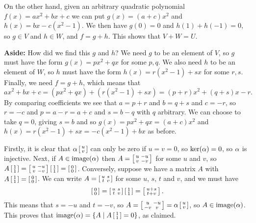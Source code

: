  On the other hand, given an arbitrary quadratic polynomial
 $f(x)=ax^2+bx+c$ we can put $g(x)=(a+c)x^2$ and
 $h(x)=bx-c(x^2-1)$.  We then have $g(0)=0$ and
 $h(1)+h(-1)=0$, so $g\in V$ and $h\in W$, and $f=g+h$.
 This shows that $V+W=U$.

 \textbf{Aside:}
 How did we find this $g$ and $h$?  We need $g$ to be an element of
 $V$, so $g$ must have the form $g(x)=px^2+qx$ for some $p,q$.  We
 also need $h$ to be an element of $W$, so $h$ must have the form
 $h(x)=r(x^2-1)+sx$ for some $r,s$.  Finally, we need $f=g+h$, which
 means that
 \[ ax^2+bx+c = (px^2+qx)+(r(x^2-1)+sx)
     = (p+r)x^2 + (q+s)x - r.
 \]
 By comparing coefficients we see that $a=p+r$ and $b=q+s$ and $c=-r$,
 so $r=-c$ and $p=a-r=a+c$ and $s=b-q$ with $q$ arbitrary.  We can
 choose to take $q=0$, giving $s=b$ and so $g(x)=px^2+qx=(a+c)x^2$ and
 $h(x)=r(x^2-1)+sx=-c(x^2-1)+bx$ as before.
\EndDeferredSolution

 Firstly, it is clear that $\alpha\left[\begin{smallmatrix} u\\ v\end{smallmatrix}\right]$ can only be
 zero if $u=v=0$, so $\ker(\alpha)=0$, so $\alpha$ is injective.
 Next, if $A\in\operatorname{image}(\alpha)$ then $A=\left[\begin{smallmatrix} u& -u\\ v&-v\end{smallmatrix}\right]$ for
 some $u$ and $v$, so
 $A\left[\begin{smallmatrix} 1\\1\end{smallmatrix}\right]=\left[\begin{smallmatrix} u&-u\\ v&-v\end{smallmatrix}\right]\left[\begin{smallmatrix} 1\\1\end{smallmatrix}\right] =
 \left[\begin{smallmatrix} 0\\0\end{smallmatrix}\right]$.  Conversely, suppose we have a matrix
 $A$ with $A\left[\begin{smallmatrix} 1\\1\end{smallmatrix}\right]=\left[\begin{smallmatrix} 0\\0\end{smallmatrix}\right]$.  We can write
 $A=\left[\begin{smallmatrix} u&s\\ t&v\end{smallmatrix}\right]$ for some $u$, $s$, $t$ and $v$, and
 we must have
 \[ \left[\begin{smallmatrix} 0\\0 \end{smallmatrix}\right] = \left[\begin{smallmatrix} u&s\\ t&v\end{smallmatrix}\right] \left[\begin{smallmatrix} 1\\1\end{smallmatrix}\right] =
     \left[\begin{smallmatrix} u+s\\ t+v\end{smallmatrix}\right].
 \]
 This means that $s=-u$ and $t=-v$, so
 $A=\left[\begin{smallmatrix} u&-u\\ -v&v\end{smallmatrix}\right]=\alpha\left[\begin{smallmatrix} u\\ v\end{smallmatrix}\right]$, so
 $A\in\operatorname{image}(\alpha)$.  This proves that
 $\operatorname{image}(\alpha)=\{A\;|\; A\left[\begin{smallmatrix} 1\\1\end{smallmatrix}\right]=0\}$, as claimed.
\EndDeferredSolution

